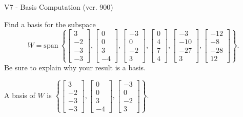 \begin{exercise}
  \begin{exerciseTitle}V7 - Basis Computation (ver. 900)\end{exerciseTitle}
  \begin{exerciseStatement}
    Find a basis for the subspace 
\[W=\mathrm{span}\ \left\{\left[\begin{array}{r}
3 \\
-2 \\
-3 \\
-3
\end{array}\right] , \left[\begin{array}{r}
0 \\
0 \\
3 \\
-4
\end{array}\right] , \left[\begin{array}{r}
-3 \\
0 \\
-2 \\
3
\end{array}\right] , \left[\begin{array}{r}
0 \\
4 \\
7 \\
4
\end{array}\right] , \left[\begin{array}{r}
-3 \\
-10 \\
-27 \\
3
\end{array}\right] , \left[\begin{array}{r}
-12 \\
-8 \\
-28 \\
12
\end{array}\right]\right\}.\]
 Be sure to explain why your result is a basis.


  \end{exerciseStatement}
  \begin{exerciseAnswer}
   A basis of \(W\) is  \(\left\{\left[\begin{array}{r}
3 \\
-2 \\
-3 \\
-3
\end{array}\right] , \left[\begin{array}{r}
0 \\
0 \\
3 \\
-4
\end{array}\right] , \left[\begin{array}{r}
-3 \\
0 \\
-2 \\
3
\end{array}\right]\right\}\).
  


  \end{exerciseAnswer}
\end{exercise}